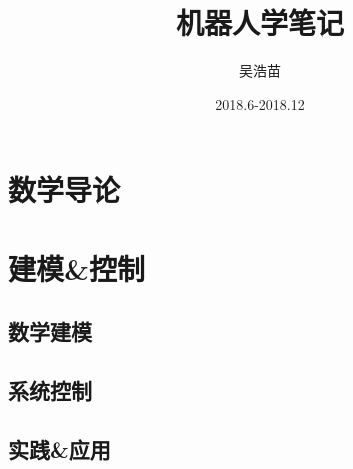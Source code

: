 \documentclass[a4paper,openany,twoside,sub4section]{book}
\begin{document}
\title{机器人学笔记}
\author{吴浩苗}
\date{2018.6-2018.12}

\frontmatter


\setcounter{page}{1}
\tableofcontents			%

\mainmatter %

\setcounter{page}{1}
\part{数学导论}

\part{建模\&控制}
	\chapter{数学建模}
	\chapter{系统控制}
	\chapter{实践\&应用}

\backmatter
\printbibliography[title={参考文献}]    %
\printindex %
\end{document}
